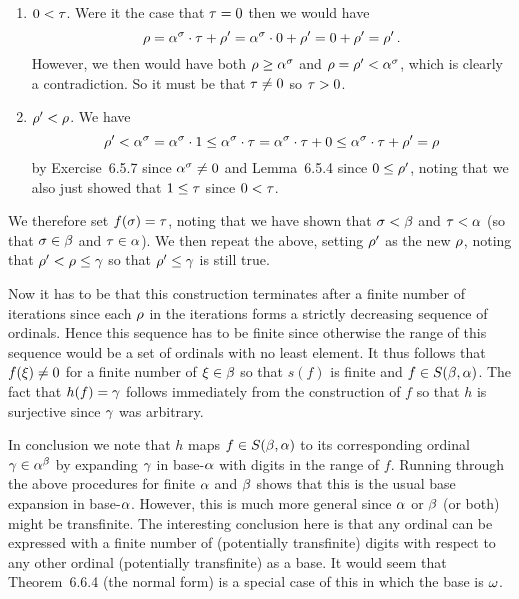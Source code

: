 {{\begin{enumerate}
    \item $0 < \tau$.
      Were it the case that $\tau = 0$ then we would have
      $$
      \rho = \alpha^\sigma \cdot \tau + \rho' = \alpha^\sigma \cdot 0 + \rho' = 0 + \rho' = \rho' \,.
      $$
      However, we then would have both $\rho \geq \alpha^\sigma$ and $\rho = \rho' < \alpha^\sigma$, which is clearly a contradiction.
      So it must be that $\tau \neq 0$ so $\tau > 0$.

    \item $\rho' < \rho$.
      We have
      $$
      \rho' < \alpha^\sigma = \alpha^\sigma \cdot 1 \leq \alpha^\sigma \cdot \tau = \alpha^\sigma \cdot \tau + 0 \leq \alpha^\sigma \cdot \tau + \rho' = \rho
      $$
      by Exercise~6.5.7 since $\alpha^\sigma \neq 0$ and Lemma~6.5.4 since $0 \leq \rho'$, noting that we also just showed that $1 \leq \tau$ since $0 < \tau$.
    \end{enumerate}

    We therefore set $f(\sigma) = \tau$, noting that we have shown that $\sigma < \beta$ and $\tau < \alpha$ (so that $\sigma \in \beta$ and $\tau \in \alpha$).
    We then repeat the above, setting $\rho'$ as the new $\rho$, noting that $\rho' < \rho \leq \gamma$ so that $\rho' \leq \gamma$ is still true.

    Now it has to be that this construction terminates after a finite number of iterations since each $\rho$ in the iterations forms a strictly decreasing sequence of ordinals.
    Hence this sequence has to be finite since otherwise the range of this sequence would be a set of ordinals with no least element.
    It thus follows that $f(\xi) \neq 0$ for a finite number of $\xi \in \beta$ so that $s(f)$ is finite and $f \in S(\beta,\alpha)$.
    The fact that $h(f) = \gamma$ follows immediately from the construction of $f$ so that $h$ is surjective since $\gamma$ was arbitrary.
  }

  In conclusion we note that $h$ maps $f \in S(\beta,\alpha)$ to its corresponding ordinal $\gamma \in \alpha^\beta$ by expanding $\gamma$ in base-$\alpha$ with digits in the range of $f$.
  Running through the above procedures for finite $\alpha$ and $\beta$ shows that this is the usual base expansion in base-$\alpha$.
  However, this is much more general since $\alpha$ or $\beta$ (or both) might be transfinite.
  The interesting conclusion here is that any ordinal can be expressed with a finite number of (potentially transfinite) digits with respect to any other ordinal (potentially transfinite) as a base.
  It would seem that Theorem~6.6.4 (the normal form) is a special case of this in which the base is $\omega$.
}
